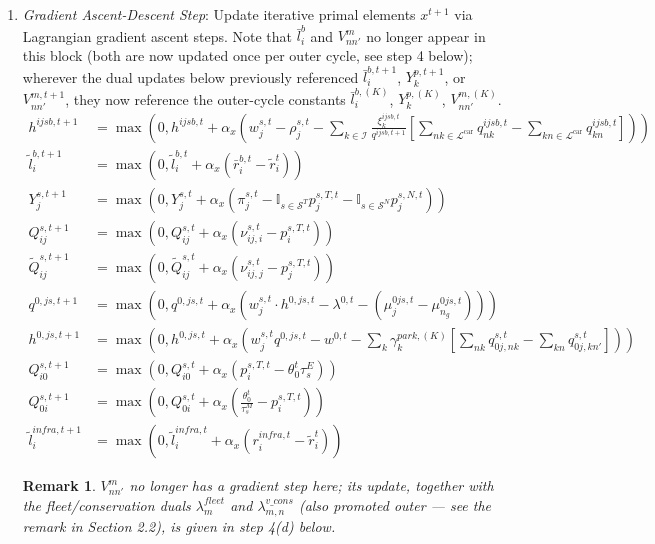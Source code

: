 \documentclass[11pt,a4paper]{article}
\newtheorem{remark}{Remark}
\newcommand{\Proj}[1]{\max\left(0, #1\right)}
\begin{document}
\begin{enumerate}
\begin{enumerate}
\begin{enumerate}
            \item \textit{Gradient Ascent-Descent Step}: Update iterative primal elements $x^{t+1}$ via Lagrangian gradient ascent steps. Note that $\bar l_i^{b}$ and $V_{nn'}^m$ no longer appear in this block (both are now updated once per outer cycle, see step 4 below); wherever the dual updates below previously referenced $\bar l_i^{b,t+1}$, $Y_k^{p,t+1}$, or $V_{nn'}^{m,t+1}$, they now reference the outer-cycle constants $\bar l_i^{b,(K)}$, $Y_k^{p,(K)}$, $V_{nn'}^{m,(K)}$.
            \begin{align}
                h^{ijsb, t+1} &= \Proj{ h^{ijsb,t} + \alpha_x \left( w^{s,t}_j - \rho^{s,t}_j - \sum_{k \in \mathcal{I}} \frac{\xi_k^{ijsb,t}}{q^{ijsb,t+1}} \left[ \sum_{nk \in \mathcal{L}^{\mathrm{car}}} q^{ijsb,t}_{nk} - \sum_{kn \in \mathcal{L}^{\mathrm{car}}} q^{ijsb,t}_{kn} \right] \right) } \\
                \tilde{l}_i^{b, t+1} &= \Proj{ \tilde{l}_i^{b,t} + \alpha_x \left( \bar{r}_i^{b,t} - \tilde{r}_i^t \right) } \\
                Y_j^{s, t+1} &= \Proj{ Y_j^{s,t} + \alpha_x \left( \pi_j^{s,t} - \mathbb{I}_{s \in \mathcal{S}^T} p_j^{s,T,t} - \mathbb{I}_{s \in \mathcal{S}^N} p_j^{s,N,t} \right) } \\
                Q_{ij}^{s, t+1} &= \Proj{ Q_{ij}^{s,t} + \alpha_x \left( \nu^{s,t}_{ij,i} - p^{s,T,t}_i \right) } \\
                \tilde{Q}_{ij}^{s, t+1} &= \Proj{ \tilde{Q}_{ij}^{s,t} + \alpha_x \left( \nu^{s,t}_{ij,j} - p^{s,T,t}_j \right) } \\
                q^{0, js, t+1} &= \Proj{ q^{0,js,t} + \alpha_x \left( w^{s,t}_j \cdot h^{0,js,t} - \lambda^{0,t} - (\mu^{0js,t}_{j} - \mu^{0js,t}_{n_g}) \right) } \\
                h^{0,js, t+1} &= \Proj{ h^{0,js,t} + \alpha_x \left( w_j^{s,t} q^{0,js,t} - w^{0,t} - \sum_{k} \gamma_k^{park,(K)} \left[ \sum_{nk} q^{s,t}_{0j,nk} - \sum_{kn} q^{s,t}_{0j,kn'} \right] \right) } \\
                Q_{i0}^{s, t+1} &= \Proj{ Q_{i0}^{s,t} + \alpha_x \left( p^{s,T,t}_i - \theta_0^t \tau^E_s \right) } \\
                Q_{0i}^{s, t+1} &= \Proj{ Q_{0i}^{s,t} + \alpha_x \left( \frac{\theta_0^t}{\tau^M_s} - p^{s,T,t}_i \right) } \\
                \tilde{l}_i^{infra, t+1} &= \Proj{ \tilde{l}_i^{infra,t} + \alpha_x \left( r_i^{infra,t} - \tilde{r}_i^t \right) }
            \end{align}
            \begin{remark}
            $V_{nn'}^m$ no longer has a gradient step here; its update, together with the fleet/conservation duals $\lambda^{fleet}_m$ and $\lambda^{v\_cons}_{m,n}$ (also promoted outer — see the remark in Section 2.2), is given in step 4(d) below.
            \end{remark}


\end{enumerate}
\end{enumerate}
\end{enumerate}
\end{document}
